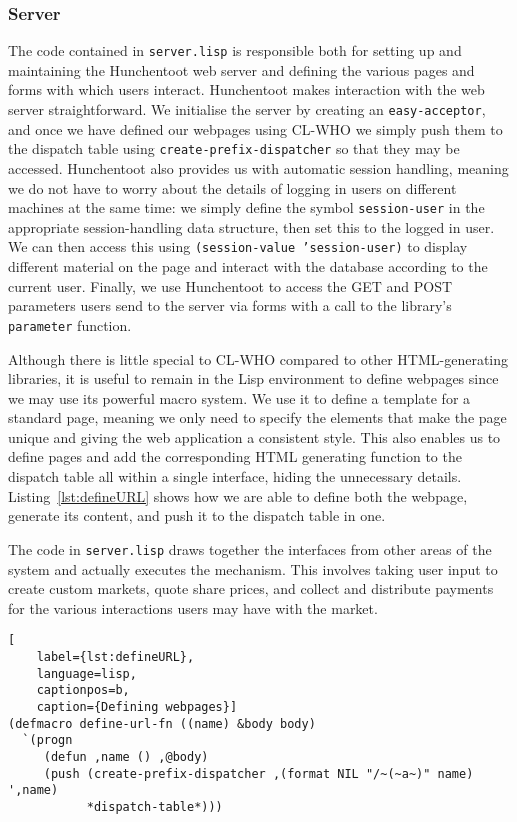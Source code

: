 \documentclass[10pt,a4paper]{article}
\theoremstyle{plain}
\theoremstyle{definition}
\newcommand{\code}[1]{\texttt{#1}}
\begin{document}
\subsubsection{Server}

The code contained in \code{server.lisp} is responsible both for setting up and
maintaining the Hunchentoot web server and defining the various pages and forms
with which users interact.  Hunchentoot makes interaction with the web server
straightforward. We initialise the server by creating an \code{easy-acceptor},
and once we have defined our webpages using CL-WHO we simply push them to the
dispatch table using \code{create-prefix-dispatcher} so that they may be
accessed. Hunchentoot also provides us with automatic session handling, meaning
we do not have to worry about the details of logging in users on different
machines at the same time: we simply define the symbol \code{session-user} in
the appropriate session-handling data structure, then set this to the logged in
user. We can then access this using \code{(session-value 'session-user)} to
display different material on the page and interact with the database according
to the current user. Finally, we use Hunchentoot to access the GET and POST
parameters users send to the server via forms with a call to the library's
\code{parameter} function. 

Although there is little special to CL-WHO compared to other HTML-generating
libraries, it is useful to remain in the Lisp environment to define webpages
since we may use its powerful macro system. We use it to define a template for
a standard page, meaning we only need to specify the elements that make the
page unique and giving the web application a consistent style. This also
enables us to define pages and add the corresponding HTML generating function
to the dispatch table all within a single interface, hiding the unnecessary
details. Listing~\ref{lst:defineURL} shows how we are able to define both the
webpage, generate its content, and push it to the dispatch table in one.

The code in \code{server.lisp} draws together the interfaces from other areas
of the system and actually executes the mechanism. This involves taking user
input to create custom markets, quote share prices, and collect and distribute
payments for the various interactions users may have with the market.

\begin{lstlisting}[
	label={lst:defineURL},
	language=lisp,
	captionpos=b,
	caption={Defining webpages}]
(defmacro define-url-fn ((name) &body body)
  `(progn
     (defun ,name () ,@body)
     (push (create-prefix-dispatcher ,(format NIL "/~(~a~)" name) ',name)
           *dispatch-table*)))
\end{lstlisting}
\end{document}
